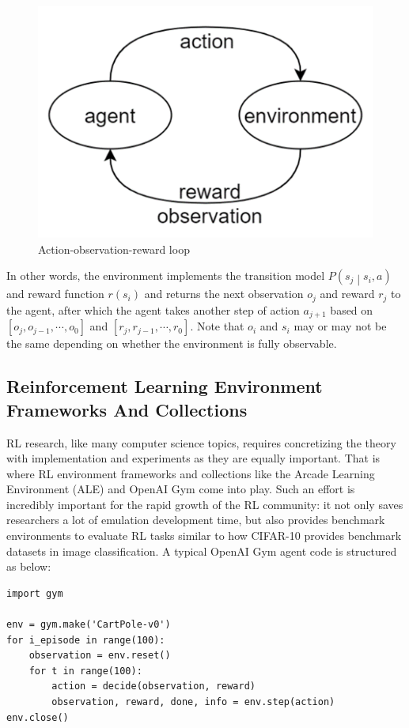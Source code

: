 \documentclass[fyp]{socreport}
\newenvironment{code}{\captionsetup{type=listing}}{}
\begin{document}
\begin{figure}[htp]
    \centering
    \includegraphics{images/obr-loop.png}
    \caption{Action-observation-reward loop}
    \label{fig:obr-loop}
\end{figure}

In other words, the environment implements the transition model $P\left(s_j\middle| s_i,a\right)$ and reward function $r\left(s_i\right)$ and returns the next observation $o_j$ and reward $r_j$ to the agent, after which the agent takes another step of action $a_{j+1}$ based on $\left[o_j,o_{j-1},\cdots,o_0\right]$ and $\left[r_j,r_{j-1},\cdots,r_0\right]$. Note that $o_i$ and $s_i$ may or may not be the same depending on whether the environment is fully observable.

\subsection{Reinforcement Learning Environment Frameworks And Collections}
RL research, like many computer science topics, requires concretizing the theory with implementation and experiments as they are equally important. That is where RL environment frameworks and collections like the Arcade Learning Environment (ALE) \cite{ale} and OpenAI Gym \cite{openai-gym} come into play. Such an effort is incredibly important for the rapid growth of the RL community: it not only saves researchers a lot of emulation development time, but also provides benchmark environments to evaluate RL tasks similar to how CIFAR-10 \cite{cifar-10} provides benchmark datasets in image classification. A typical OpenAI Gym agent code is structured as below:

\begin{code}
\begin{verbatim}
import gym

env = gym.make('CartPole-v0')
for i_episode in range(100):
    observation = env.reset()
    for t in range(100):
        action = decide(observation, reward)
        observation, reward, done, info = env.step(action)
env.close()
\end{verbatim}
\label{code:gym-agent}
\end{code}
\end{document}
